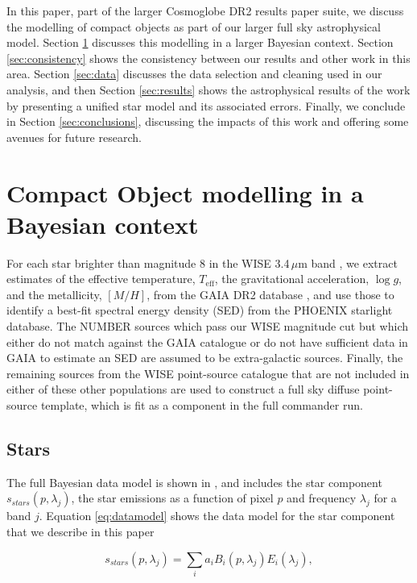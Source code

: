 \documentclass{aa}
\begin{document}
In this paper, part of the larger Cosmoglobe DR2 results paper suite, we discuss the modelling of compact objects as part of our larger full sky astrophysical model. Section \ref{sec:models} discusses this modelling in a larger Bayesian context. Section \ref{sec:consistency} shows the consistency between our results and other work in this area. Section \ref{sec:data} discusses the data selection and cleaning used in our analysis, and then Section \ref{sec:results} shows the astrophysical results of the work by presenting a unified star model and its associated errors. Finally, we conclude in Section \ref{sec:conclusions}, discussing the impacts of this work and offering some avenues for future research.

\section{Compact Object modelling in a Bayesian context}
\label{sec:models}

For each star brighter than magnitude 8 in the WISE 3.4$\,\mu$m band \citep{wiseCat}, we extract estimates of the effective temperature, $T_{\mathrm{eff}}$, the gravitational acceleration, $\log g$, and the metallicity, $[M/H]$, from the GAIA DR2 database \cite{gaiaCat}, and use those to identify a best-fit spectral energy density (SED) from the PHOENIX starlight database. The NUMBER sources which pass our WISE magnitude cut but which either do not match against the GAIA catalogue or do not have sufficient data in GAIA to estimate an SED are assumed to be extra-galactic sources. Finally, the remaining sources from the WISE point-source catalogue that are not included in either of these other populations are used to construct a full sky diffuse point-source template, which is fit as a component in the full commander run. 

\subsection{Stars}

The full Bayesian data model is shown in \cite{CG02_01}, and includes the star component $s_{stars}(p, \lambda_j)$, the star emissions as a function of pixel $p$ and frequency $\lambda_j$ for a band $j$. Equation \ref{eq:datamodel} shows the data model for the star component that we describe in this paper

\begin{equation}
s_{stars}(p, \lambda_j) = \sum_i a_i B_i(p, \lambda_j) E_i(\lambda_j),
\label{eq:datamodel}
\end{equation}
\end{document}
